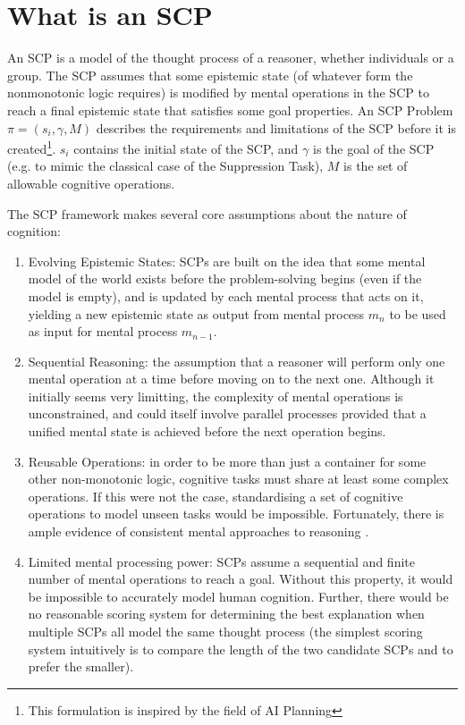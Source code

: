 \documentclass{article}
\begin{document}
\section{What is an SCP}

An SCP is a model of the thought process of a reasoner, whether individuals or a group. The SCP assumes that some epistemic state (of whatever form the nonmonotonic logic requires) is modified by mental operations in the SCP to reach a final epistemic state that satisfies some goal properties. An SCP Problem $\pi=(s_i,\gamma,M)$ describes the requirements and limitations of the SCP before it is created\footnote{This formulation is inspired by the field of AI Planning}. $s_i$ contains the initial state of the SCP, and $\gamma$ is the goal of the SCP (e.g. to mimic the classical case of the Suppression Task), $M$ is the set of allowable cognitive operations.

The SCP framework makes several core assumptions about the nature of cognition:


\begin{enumerate}
\item Evolving Epistemic States: SCPs are built on the idea that some mental model of the world exists before the problem-solving begins (even if the model is empty), and is updated by each mental process that acts on it, yielding a new epistemic state as output from mental process $m_n$ to be used as input for mental process $m_{n-1}$.
\item Sequential Reasoning: the assumption that a reasoner will perform only one mental operation at a time before moving on to the next one. Although it initially seems very limitting, the complexity of mental operations is unconstrained, and could itself involve parallel processes provided that a unified mental state is achieved before the next operation begins.
\item Reusable Operations: in order to be more than just a container for some other non-monotonic logic, cognitive tasks must share at least some complex operations. If this were not the case, standardising a set of cognitive operations to model unseen tasks would be impossible. Fortunately, there is ample evidence of consistent mental approaches to reasoning \citep{ragni2017formal}.
\item Limited mental processing power: SCPs assume a sequential and finite number of mental operations to reach a goal. Without this property, it would be impossible to accurately model human cognition. Further, there would be no reasonable scoring system for determining the best explanation when multiple SCPs all model the same thought process (the simplest scoring system intuitively is to compare the length of the two candidate SCPs and to prefer the smaller).
\end{enumerate}
\end{document}
